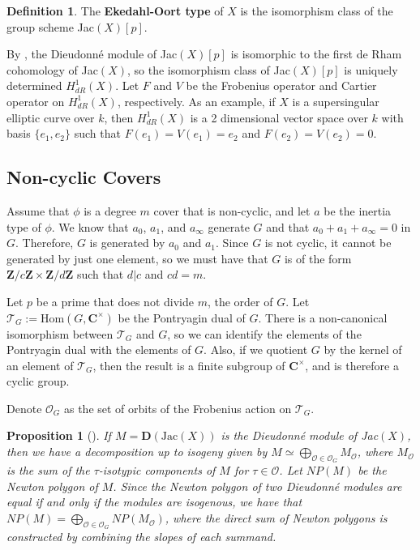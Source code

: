\documentclass{article}
\newtheorem{proposition}[theorem]{Proposition}
\theoremstyle{remark}
\theoremstyle{definition}
\newtheorem{definition}[theorem]{Definition}
\begin{document}
\begin{definition}
    The \textbf{Ekedahl-Oort type} of $X$ is the isomorphism class of the group scheme Jac$(X)[p]$.
\end{definition}

\par By \cite{oda}, the Dieudonn\'e module of Jac$(X)[p]$ is isomorphic to the first de Rham cohomology of Jac$(X)$, so the isomorphism class of Jac$(X)[p]$ is uniquely determined $H^1_{dR}(X)$. Let $F$ and $V$ be the Frobenius operator and Cartier operator on $H^1_{dR}(X)$, respectively. As an example, if $X$ is a supersingular elliptic curve over $k$, then $H^1_{dR}(X)$ is a 2 dimensional vector space over $k$ with basis $\{e_1,e_2\}$ such that $F(e_1) = V(e_1) = e_2$ and $F(e_2) = V(e_2) = 0$.

\subsection{Non-cyclic Covers}
\par \hspace{\parindent} Assume that $\phi$ is a degree $m$ cover that is non-cyclic, and let $a$ be the inertia type of $\phi$. We know that $a_0$, $a_1$, and $a_\infty$ generate $G$ and that $a_0 + a_1 + a_\infty = 0$ in $G$. Therefore, $G$ is generated by $a_0$ and $a_1$. Since $G$ is not cyclic, it cannot be generated by just one element, so we must have that $G$ is of the form $\mathbf{Z}/c\mathbf{Z} \times \mathbf{Z}/d \mathbf{Z}$ such that $d | c$ and $cd = m$.

\par Let $p$ be a prime that does not divide $m$, the order of $G$. Let $\mathcal{T}_G := \textrm{Hom}(G,\mathbf{C}^\times)$ be the Pontryagin dual of $G$. There is a non-canonical isomorphism between $\mathcal{T}_G$ and $G$, so we can identify the elements of the Pontryagin dual with the elements of $G$. Also, if we quotient $G$ by the kernel of an element of $\mathcal{T}_G$, then the result is a finite subgroup of $\mathbf{C}^\times$, and is therefore a cyclic group. 

\par Denote $\mathcal{O}_G$ as the set of orbits of the Frobenius action on $\mathcal{T}_G$.

\begin{proposition}
[]
    If $M = \mathbf{D}(\textrm{Jac}(X))$ is the Dieudonn\'{e} module of Jac$(X)$, then we have a decomposition up to isogeny given by $M \simeq \bigoplus_{\mathcal{O} \in \mathcal{O}_G} M_{\mathcal{O}}$, where $M_{\mathcal{O}}$ is the sum of the $\tau$-isotypic components of $M$ for $\tau \in \mathcal{O}$. Let $NP(M)$ be the Newton polygon of $M$. Since the Newton polygon of two Dieudonn\'{e} modules are equal if and only if the modules are isogenous, we have that $NP(M) = \bigoplus_{\mathcal{O} \in \mathcal{O}_G} NP(M_\mathcal{O})$, where the direct sum of Newton polygons is constructed by combining the slopes of each summand.
\end{proposition}
\end{document}

